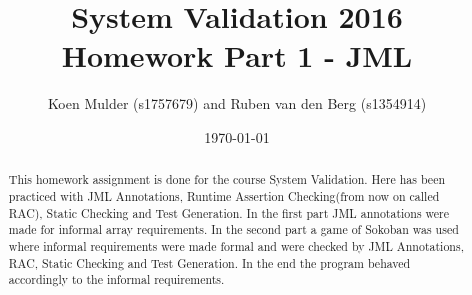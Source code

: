 \documentclass[a4paper]{article}
\title{System Validation 2016 \\ Homework Part 1 - JML}
\author{Koen Mulder (s1757679) and Ruben van den Berg (s1354914)}
\date{\today}
\begin{document}
	\maketitle
	
	\begin{abstract}
		This homework assignment is done for the course System Validation. Here has been practiced with JML Annotations, Runtime Assertion Checking(from now on called RAC), Static Checking and Test Generation. In the first part JML annotations were made for informal array requirements. In the second part a game of Sokoban was used where informal requirements were made formal and were checked by JML Annotations, RAC, Static Checking and Test Generation. In the end the program behaved accordingly to the informal requirements. 
	\end{abstract}
	
\end{document}
